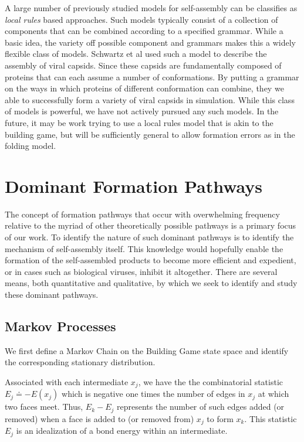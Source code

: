 \documentclass[12pt]{article}
\begin{document}
A large number of previously studied models for self-assembly can be classifies as \textit{local rules} based approaches. Such models typically consist of a collection of components that can be combined according to a specified grammar. While a basic idea, the variety off possible component and grammars makes this a widely flexible class of models. Schwartz et al used such a model to describe the assembly of viral capsids. Since these capsids are fundamentally composed of proteins that can each assume a number of conformations. By putting a grammar on the ways in which proteins of different conformation can combine, they we able to successfully form a variety of viral capsids in simulation. While this class of models is powerful, we have not actively pursued any such models. In the future, it may be work trying to use a local rules model that is akin to the building game, but will be sufficiently general to allow formation errors as in the folding model.    

\section{Dominant Formation Pathways}

The concept of formation pathways that occur with overwhelming frequency relative to the myriad of other theoretically possible pathways is a primary focus of our work. To identify the nature of such dominant pathways is to identify the mechanism of self-assembly itself. This knowledge would hopefully enable the formation of the self-assembled products to become more efficient and expedient, or in cases such as biological viruses, inhibit it altogether. There are several means, both quantitative and qualitative, by which we seek to identify and study these dominant pathways. 

\subsection{Markov Processes}


We first define a Markov Chain on the Building Game state space and identify the corresponding stationary distribution. 

Associated with each intermediate $x_j$, we have the the combinatorial statistic $E_j \doteq -E(x_j)$ which is negative one times the number of edges in $x_j$ at which two faces meet. Thus, $E_k-E_j$ represents the number of such edges added (or removed) when a face is added to (or removed from) $x_j$ to form $x_k$. This statistic $E_j$ is an idealization of a bond energy within an intermediate.
\end{document}
